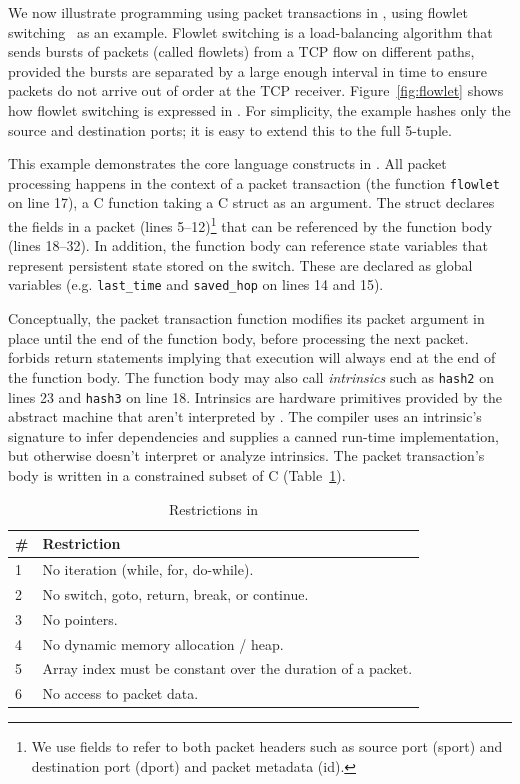 We now illustrate programming using packet transactions in \pktlanguage, using
flowlet switching~\cite{flowlets} as an example. Flowlet switching is a
load-balancing algorithm that sends bursts of packets (called flowlets) from a
TCP flow on different paths, provided the bursts are separated by a large
enough interval in time to ensure packets do not arrive out of order at the TCP
receiver. Figure~\ref{fig:flowlet} shows how flowlet switching is expressed in
\pktlanguage. For simplicity, the example hashes only the source and
destination ports; it is easy to extend this to the full 5-tuple.

This example demonstrates the core language constructs in \pktlanguage. All
packet processing happens in the context of a packet transaction (the function
\texttt{flowlet} on line 17), a C function taking a C struct as an argument.
The struct declares the fields in a packet (lines 5--12)\footnote{We use fields
to refer to both packet headers such as source port (sport) and destination
port (dport) and packet metadata (id).} that can be referenced by the function
body (lines 18--32).  In addition, the function body can reference state
variables that represent persistent state stored on the switch. These are
declared as global variables (e.g. \texttt{last\_time} and \texttt{saved\_hop}
on lines 14 and 15).

Conceptually, the packet transaction function modifies its packet argument in
place until the end of the function body, before processing the next packet.
\pktlanguage forbids return statements implying that execution will always end
at the end of the function body. The function body may also call
\textit{intrinsics} such as \texttt{hash2} on lines 23 and \texttt{hash3} on
line 18.  Intrinsics are hardware primitives provided by the abstract machine
that aren't interpreted by \pktlanguage. The \pktlanguage compiler uses an
intrinsic's signature to infer dependencies and supplies a canned run-time
implementation, but otherwise doesn't interpret or analyze intrinsics. The
packet transaction's body is written in a constrained subset of C
(Table~\ref{tab:restrict}).

\begin{table}
  \begin{tabular}{|p{}|p{}|}
    \hline
    \# & Restriction \\
    \hline
    1 & No iteration (while, for, do-while).\\
    \hline
    2 & No switch, goto, return, break, or continue.\\
    \hline
    3 & No pointers.\\
    \hline
    4 & No dynamic memory allocation / heap.\\
    \hline
    5 & Array index must be constant over the duration of a packet.\\
    \hline
    6 & No access to packet data.\\
    \hline
  \end{tabular}
  \caption{Restrictions in \pktlanguage}
  \label{tab:restrict}
\end{table}

